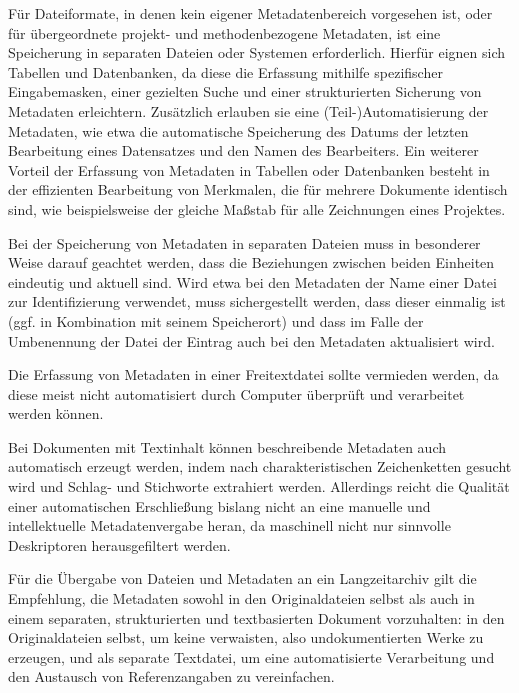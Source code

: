 Für Dateiformate, in denen kein eigener Metadatenbereich vorgesehen ist, oder für übergeordnete projekt- und methodenbezogene Metadaten, ist eine Speicherung in separaten Dateien oder Systemen erforderlich. Hierfür eignen sich Tabellen und Datenbanken, da diese die Erfassung mithilfe spezifischer Eingabemasken, einer gezielten Suche und einer strukturierten Sicherung von Metadaten erleichtern. Zusätzlich erlauben sie eine (Teil-)Automatisierung der Metadaten, wie etwa die automatische Speicherung des Datums der letzten Bearbeitung eines Datensatzes und den Namen des Bearbeiters. Ein weiterer Vorteil der Erfassung von Metadaten in Tabellen oder Datenbanken besteht in der effizienten Bearbeitung von Merkmalen, die für mehrere Dokumente identisch sind, wie beispielsweise der gleiche Maßstab für alle Zeichnungen eines Projektes.

Bei der Speicherung von Metadaten in separaten Dateien muss in besonderer Weise darauf geachtet werden, dass die Beziehungen zwischen beiden Einheiten eindeutig und aktuell sind. Wird etwa bei den Metadaten der Name einer Datei zur Identifizierung verwendet, muss sichergestellt werden, dass dieser einmalig ist (ggf. in Kombination mit seinem Speicherort) und dass im Falle der Umbenennung der Datei der Eintrag auch bei den Metadaten aktualisiert wird.

Die Erfassung von Metadaten in einer Freitextdatei sollte vermieden werden, da diese meist nicht automatisiert durch Computer überprüft und verarbeitet werden können.

Bei Dokumenten mit Textinhalt können beschreibende Metadaten auch automatisch erzeugt werden, indem nach charakteristischen Zeichenketten gesucht wird und Schlag- und Stichworte extrahiert werden. Allerdings reicht die Qualität einer automatischen Erschließung bislang nicht an eine manuelle und intellektuelle Metadatenvergabe heran, da maschinell nicht nur sinnvolle Deskriptoren herausgefiltert werden.

Für die Übergabe von Dateien und Metadaten an ein Langzeitarchiv gilt die Empfehlung, die Metadaten sowohl in den Originaldateien selbst als auch in einem separaten, strukturierten und textbasierten Dokument vorzuhalten: in den Originaldateien selbst, um keine verwaisten, also undokumentierten Werke zu erzeugen, und als separate Textdatei, um eine automatisierte Verarbeitung und den Austausch von Referenzangaben zu vereinfachen.